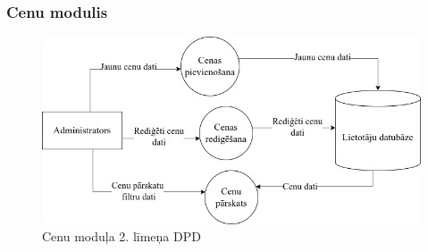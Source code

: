 \subsubsection{Cenu modulis}

\begin{figure}[htbp]
	\centering
	\includegraphics[width=\linewidth]{./src/img/CenuModulis.png}
	\caption{Cenu moduļa 2. līmeņa DPD}
	\label{fig:dpd-2-price}
\end{figure}




